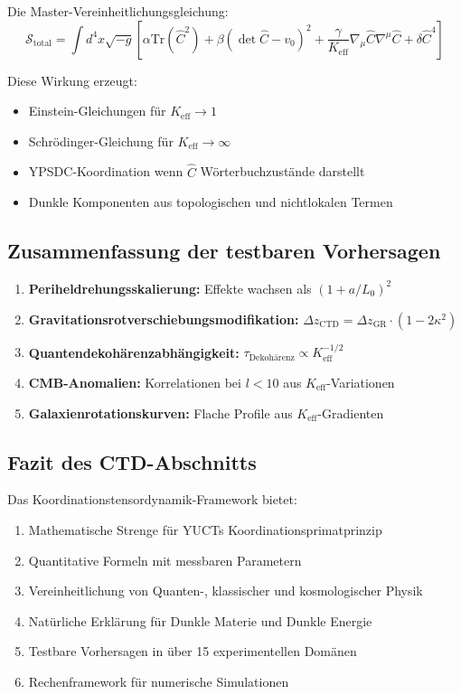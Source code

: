 \documentclass[11pt,a4paper]{article}
\begin{document}
	Die Master-Vereinheitlichungsgleichung:
	\[
	\boxed{\mathcal{S}_{\mathrm{total}} = \int d^{4}x \sqrt{-g} \left[ \alpha \mathrm{Tr}(\hat{C}^2) + \beta (\det\hat{C} - v_0)^2 + \frac{\gamma}{K_{\mathrm{eff}}} \nabla_\mu\hat{C}\nabla^\mu\hat{C} + \delta \hat{C}^4 \right]}
	\]
	
	Diese Wirkung erzeugt:
	\begin{itemize}
		\item Einstein-Gleichungen für $K_{\mathrm{eff}} \to 1$
		\item Schrödinger-Gleichung für $K_{\mathrm{eff}} \to \infty$  
		\item YPSDC-Koordination wenn $\hat{C}$ Wörterbuchzustände darstellt
		\item Dunkle Komponenten aus topologischen und nichtlokalen Termen
	\end{itemize}
	
	\subsection{Zusammenfassung der testbaren Vorhersagen}
	
	\begin{enumerate}
		\item \textbf{Periheldrehungsskalierung:} Effekte wachsen als $(1 + a/L_0)^2$
		\item \textbf{Gravitationsrotverschiebungsmodifikation:} $\Delta z_{\mathrm{CTD}} = \Delta z_{\mathrm{GR}} \cdot (1 - 2\kappa^2)$
		\item \textbf{Quantendekohärenzabhängigkeit:} $\tau_{\mathrm{Dekohärenz}} \propto K_{\mathrm{eff}}^{-1/2}$
		\item \textbf{CMB-Anomalien:} Korrelationen bei $l < 10$ aus $K_{\mathrm{eff}}$-Variationen
		\item \textbf{Galaxienrotationskurven:} Flache Profile aus $K_{\mathrm{eff}}$-Gradienten
	\end{enumerate}
	
	\subsection{Fazit des CTD-Abschnitts}
	
	Das Koordinationstensordynamik-Framework bietet:
	\begin{enumerate}
		\item Mathematische Strenge für YUCTs Koordinationsprimatprinzip
		\item Quantitative Formeln mit messbaren Parametern
		\item Vereinheitlichung von Quanten-, klassischer und kosmologischer Physik
		\item Natürliche Erklärung für Dunkle Materie und Dunkle Energie
		\item Testbare Vorhersagen in über 15 experimentellen Domänen
		\item Rechenframework für numerische Simulationen
	\end{enumerate}
	
\end{document}
